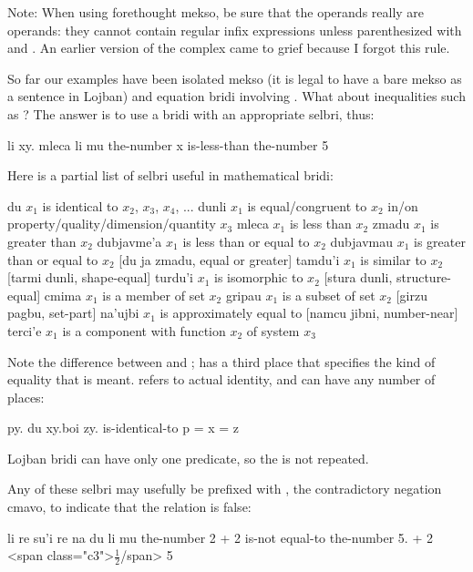Note: When using forethought mekso, be sure that the operands
    really are operands: they cannot contain regular infix
    expressions unless parenthesized with  and . An
    earlier version of the complex  came to grief because I forgot this rule.



So far our examples have been isolated mekso (it is legal to
    have a bare mekso as a sentence in Lojban) and equation bridi
    involving . What about inequalities such as ?
    The answer is to use a bridi with an appropriate selbri,
    thus:
\begin{example}
li xy. mleca li mu\n
the-number x is-less-than the-number 5
\end{example}

Here is a partial list of selbri useful in mathematical
    bridi:

   du      $x_1$ is identical to $x_2$, $x_3$, $x_4$, ...
    dunli       $x_1$ is equal/congruent to $x_2$ in/on
            property/quality/dimension/quantity $x_3$
    mleca       $x_1$ is less than $x_2$
    zmadu       $x_1$ is greater than $x_2$
    dubjavme'a  $x_1$ is less than or equal to $x_2$
    dubjavmau   $x_1$ is greater than or equal to $x_2$
                [du ja zmadu, equal or greater]
    tamdu'i     $x_1$ is similar to $x_2$
                [tarmi dunli, shape-equal]
    turdu'i     $x_1$ is isomorphic to $x_2$
                [stura dunli, structure-equal]
    cmima       $x_1$ is a member of set $x_2$
    gripau      $x_1$ is a subset of set $x_2$
                [girzu pagbu, set-part]
    na'ujbi     $x_1$ is approximately equal to
                [namcu jibni, number-near]
    terci'e     $x_1$ is a component with function $x_2$
            of system $x_3$

Note the difference between  and ;  has
    a third place that specifies the kind of equality that is
    meant.  refers to actual identity, and can have any
    number of places:
\begin{example}
py. du xy.boi zy.\n
{} is-identical-to  \n
p = x = z
\end{example}

Lojban bridi can have only one predicate, so the  is
    not repeated.

Any of these selbri may usefully be prefixed with ,
    the contradictory negation cmavo, to indicate that the relation
    is false:
\begin{example}
li re su'i re na du li mu\n
the-number 2 + 2 is-not equal-to the-number 5. + 2 <span class="c3">$\frac{1}{2}$/span> 5
\end{example}

